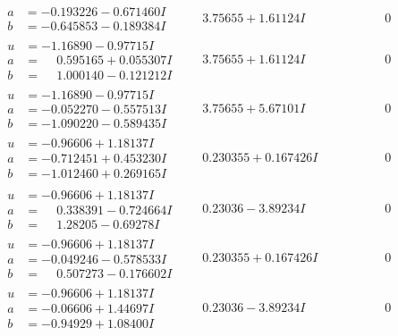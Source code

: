 \documentclass[1p]{elsarticle_modified}
\theoremstyle{definition}
\begin{document}
$$\begin{array}{c|c|c}
\begin{aligned}
a &= -0.193226 - 0.671460 I \\
b &= -0.645853 - 0.189384 I\end{aligned}
 & \phantom{-}3.75655 + 1.61124 I & \phantom{-0.000000 } 0 \\ \hline\begin{aligned}
u &= -1.16890 - 0.97715 I \\
a &= \phantom{-}0.595165 + 0.055307 I \\
b &= \phantom{-}1.000140 - 0.121212 I\end{aligned}
 & \phantom{-}3.75655 + 1.61124 I & \phantom{-0.000000 } 0 \\ \hline\begin{aligned}
u &= -1.16890 - 0.97715 I \\
a &= -0.052270 - 0.557513 I \\
b &= -1.090220 - 0.589435 I\end{aligned}
 & \phantom{-}3.75655 + 5.67101 I & \phantom{-0.000000 } 0 \\ \hline\begin{aligned}
u &= -0.96606 + 1.18137 I \\
a &= -0.712451 + 0.453230 I \\
b &= -1.012460 + 0.269165 I\end{aligned}
 & \phantom{-}0.230355 + 0.167426 I & \phantom{-0.000000 } 0 \\ \hline\begin{aligned}
u &= -0.96606 + 1.18137 I \\
a &= \phantom{-}0.338391 - 0.724664 I \\
b &= \phantom{-}1.28205 - 0.69278 I\end{aligned}
 & \phantom{-}0.23036 - 3.89234 I & \phantom{-0.000000 } 0 \\ \hline\begin{aligned}
u &= -0.96606 + 1.18137 I \\
a &= -0.049246 - 0.578533 I \\
b &= \phantom{-}0.507273 - 0.176602 I\end{aligned}
 & \phantom{-}0.230355 + 0.167426 I & \phantom{-0.000000 } 0 \\ \hline\begin{aligned}
u &= -0.96606 + 1.18137 I \\
a &= -0.06606 + 1.44697 I \\
b &= -0.94929 + 1.08400 I\end{aligned}
 & \phantom{-}0.23036 - 3.89234 I & \phantom{-0.000000 } 0\\

\end{array}$$
\end{document}
